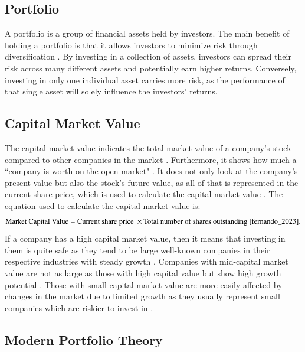 \documentclass[12pt]{report}
\begin{document}
\subsection{Portfolio}
A portfolio is a group of financial assets held by investors. The main benefit of holding a portfolio is that it allows investors to minimize risk through diversification \cite{10.2307/2975974}. By investing in a collection of assets, investors can spread their risk across many different assets and potentially earn higher returns. Conversely, investing in only one individual asset carries more risk, as the performance of that single asset will solely influence the investors' returns.
\subsection{Capital Market Value}
The capital market value indicates the total market value of a company's stock compared to other companies in the market \cite{fidelity}. Furthermore, it shows how much a ``company is worth on the open market" \cite{fidelity}. It does not only look at the company's present value but also the stock's future value, as all of that is represented in the current share price, which is used to calculate the capital market value \cite{fidelity}. The equation used to calculate the capital market value is: 
\begin{equation*}
    \text{Market Capital Value} = \text{Current share price } \times \text{Total number of shares outstanding \cite{fernando_2023}}.
\end{equation*}
If a company has a high capital market value, then it means that investing in them is quite safe as they tend to be large well-known companies in their respective industries with steady growth \cite{fidelity}. Companies with mid-capital market value are not as large as those with high capital value but show high growth potential \cite{fidelity}. Those with small capital market value are more easily affected by changes in the market due to limited growth as they usually represent small companies which are riskier to invest in \cite{fidelity}.

\subsection{Modern Portfolio Theory} \label{mpt}
\end{document}
